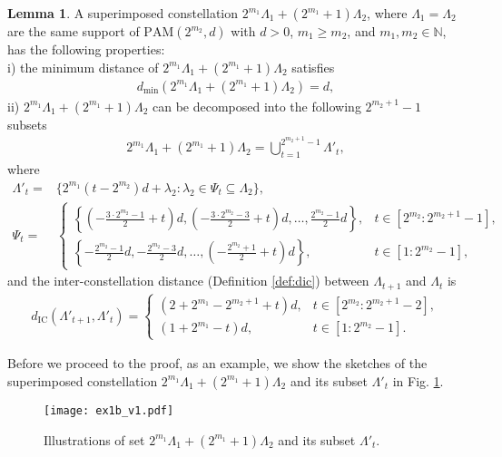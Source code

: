 \documentclass[12pt, draftclsnofoot, onecolumn]{IEEEtran}
\newcommand{\E}{\mathbb{E}}
\theoremstyle{definition}
\newtheorem{lemma}{Lemma}
\begin{document}
\begin{lemma}\label{fact:1}
A superimposed constellation $2^{m_1}\Lambda_1+(2^{m_1}+1)\Lambda_2$, where $\Lambda_1=\Lambda_2$ are the same support of $\text{PAM}(2^{m_2},d)$ with $d>0$, $m_1\geq m_2$, and $m_1,m_2\in \mathbb{N}$, has the following properties:\\
i) the minimum distance of $2^{m_1}\Lambda_1+(2^{m_1}+1)\Lambda_2$ satisfies
\begin{align}
d_{\min}(2^{m_1}\Lambda_1+(2^{m_1}+1)\Lambda_2) = d,
\end{align}
ii) $2^{m_1}\Lambda_1+(2^{m_1}+1)\Lambda_2$ can be decomposed into the following $2^{m_2+1}-1$ subsets
\begin{align}\label{fact:1a}
2^{m_1}\Lambda_1+(2^{m_1}+1)\Lambda_2 = \bigcup_{t=1}^{2^{m_2+1}-1}\Lambda'_t,
\end{align}
where
\begin{align}
\Lambda'_t =&\{2^{m_1}(t-2^{m_2})d+\lambda_2:\lambda_2 \in \Psi_t\subseteq \Lambda_2\},\\
\Psi_t=&\left\{\begin{array}{ll}\left\{\left(-\frac{3\cdot2^{m_2}-1}{2}+t\right)d,\left(-\frac{3\cdot2^{m_2}-3}{2}+t\right)d,\ldots,\frac{2^{m_2}-1}{2}d\right\},&t\in [2^{m_2}:2^{m_2+1}-1],\\
\left\{-\frac{2^{m_2}-1}{2}d,-\frac{2^{m_2}-3}{2}d,\ldots,\left(-\frac{2^{m_2}+1}{2}+t\right)d\right\},&t \in[1 :2^{m_2}-1],
\end{array}\right. \label{eq:C_t_plus}
\end{align}
and the inter-constellation distance (Definition \ref{def:dic}) between $\Lambda_{t+1}$ and $\Lambda_{t}$ is
\begin{align}\label{dic_lambdat_result}
d_{\text{IC}}(\Lambda'_{t+1},\Lambda'_{t})    =\left\{\begin{array}{ll} (2+2^{m_1}-2^{m_2+1}+t)d,& t \in [2^{m_2}:2^{m_2+1}-2], \\
(1+2^{m_1}-t)d, &t \in [1:2^{m_2}-1].
\end{array}\right.
\end{align}
\end{lemma}
Before we proceed to the proof, as an example, we show the sketches of the superimposed constellation $2^{m_1}\Lambda_1+(2^{m_1}+1)\Lambda_2$ and its subset $\Lambda'_t$ in Fig. \ref{fig:illustration}.
\begin{figure}[t!]
	\centering
\texttt{[image: ex1b\_v1.pdf]}
\caption{Illustrations of set $2^{m_1}\Lambda_1+(2^{m_1}+1)\Lambda_2$ and its subset $\Lambda'_t$.}
\label{fig:illustration}
\end{figure}
\end{document}
